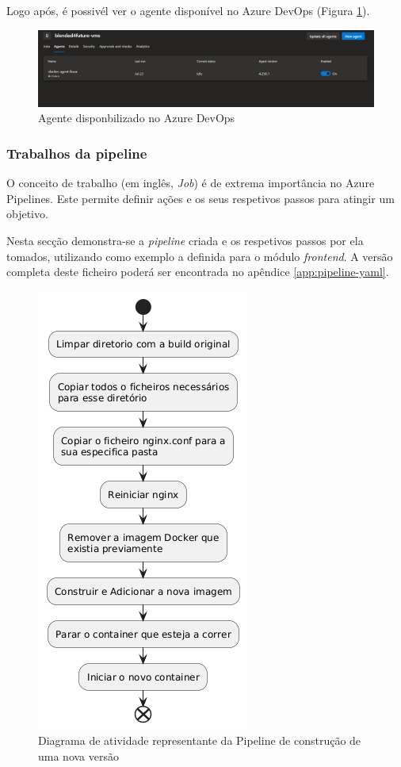 Logo após, é possivél ver o agente disponível no Azure DevOps (Figura \ref{fig:agent-devops}). 

\begin{figure}[h!tbp]
\includegraphics[width=\linewidth]{capitulos/cap4-implementacao/assets/devops-agent.png}
\caption{Agente disponbilizado no Azure DevOps}
\label{fig:agent-devops}
\end{figure}

\subsubsection{Trabalhos da pipeline}

O conceito de trabalho (em inglês, \textit{Job}) é de extrema importância no Azure Pipelines. Este permite definir ações e os seus respetivos passos para atingir um objetivo.

Nesta secção demonstra-se a \textit{pipeline} criada e os respetivos passos por ela tomados, utilizando como exemplo a definida para o módulo \textit{frontend}. A versão completa deste ficheiro poderá ser encontrada no apêndice \ref{app:pipeline-yaml}. 

\begin{figure}[h!tbp]
    \centering
    \includegraphics[width=0.3\linewidth]{capitulos/cap4-implementacao/assets/pipeline-activity-diagram.png}
    \caption{Diagrama de atividade representante da Pipeline de construção de uma nova versão}
    \label{fig:pipeline-ad}
\end{figure}


